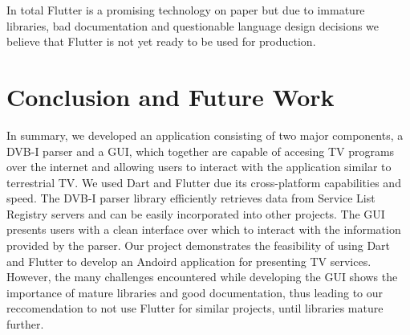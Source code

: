 \documentclass[conference]{IEEEtran}
\begin{document}
In total Flutter is a promising technology on paper but due to immature libraries, bad documentation and questionable language design decisions we believe that Flutter is not yet ready to be used for production. 








\section{Conclusion and Future Work}
In summary, we developed an application consisting of two major components, a DVB-I parser and a GUI, which together are capable of accesing TV programs over the internet and allowing users to interact with the application similar to terrestrial TV.  We used Dart and Flutter due its cross-platform capabilities and speed. The DVB-I parser library efficiently retrieves data from Service List Registry servers and can be easily incorporated into other projects. The GUI presents users with a clean interface over which to interact with the information provided by the parser. Our project demonstrates the feasibility of using Dart and Flutter to develop an Andoird application for presenting TV services. However, the many challenges encountered while developing the GUI shows the importance of mature libraries and good documentation, thus leading to our reccomendation to not use Flutter for similar projects, until libraries mature further. \\\par
\end{document}
